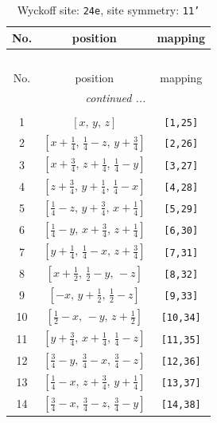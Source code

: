 \documentclass[fleqn,8pt]{jsarticle}
\begin{document}
\begin{longtable}{ccc}
\caption{Wyckoff site: {\tt 24e}, site symmetry: {\tt 11'}}
 \\
 \hline \hline
No. & position & mapping \\ \hline \endfirsthead

\multicolumn{2}{l}{\tablename\ \thetable{}} \\
 \hline \hline
No. & position & mapping \\ \hline \endhead

 \hline \hline
\multicolumn{2}{r}{\footnotesize\it continued ...} \\ \endfoot

 \hline \hline
\multicolumn{2}{r}{} \\ \endlastfoot

1 & $\left[ x,\, y,\, z \right]$ & {\tt [1,25]} \\ \hline
2 & $\left[ x + \frac{1}{4},\, \frac{1}{4} - z,\, y + \frac{3}{4} \right]$ & {\tt [2,26]} \\ \hline
3 & $\left[ x + \frac{3}{4},\, z + \frac{1}{4},\, \frac{1}{4} - y \right]$ & {\tt [3,27]} \\ \hline
4 & $\left[ z + \frac{3}{4},\, y + \frac{1}{4},\, \frac{1}{4} - x \right]$ & {\tt [4,28]} \\ \hline
5 & $\left[ \frac{1}{4} - z,\, y + \frac{3}{4},\, x + \frac{1}{4} \right]$ & {\tt [5,29]} \\ \hline
6 & $\left[ \frac{1}{4} - y,\, x + \frac{3}{4},\, z + \frac{1}{4} \right]$ & {\tt [6,30]} \\ \hline
7 & $\left[ y + \frac{1}{4},\, \frac{1}{4} - x,\, z + \frac{3}{4} \right]$ & {\tt [7,31]} \\ \hline
8 & $\left[ x + \frac{1}{2},\, \frac{1}{2} - y,\, - z \right]$ & {\tt [8,32]} \\ \hline
9 & $\left[ - x,\, y + \frac{1}{2},\, \frac{1}{2} - z \right]$ & {\tt [9,33]} \\ \hline
10 & $\left[ \frac{1}{2} - x,\, - y,\, z + \frac{1}{2} \right]$ & {\tt [10,34]} \\ \hline
11 & $\left[ y + \frac{3}{4},\, x + \frac{1}{4},\, \frac{1}{4} - z \right]$ & {\tt [11,35]} \\ \hline
12 & $\left[ \frac{3}{4} - y,\, \frac{3}{4} - x,\, \frac{3}{4} - z \right]$ & {\tt [12,36]} \\ \hline
13 & $\left[ \frac{1}{4} - x,\, z + \frac{3}{4},\, y + \frac{1}{4} \right]$ & {\tt [13,37]} \\ \hline
14 & $\left[ \frac{3}{4} - x,\, \frac{3}{4} - z,\, \frac{3}{4} - y \right]$ & {\tt [14,38]} \\ \hline

\end{longtable}
\end{document}
